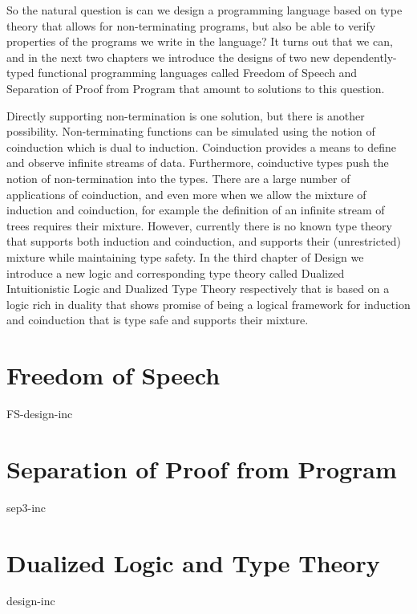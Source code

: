 \documentclass[phd,appendix,dedicationpage,ackpage,epigraphpage]{uithesis}
\begin{document}
So the natural question is can we design a programming language based
on type theory that allows for non-terminating programs, but also be
able to verify properties of the programs we write in the language?
It turns out that we can, and in the next two chapters we introduce
the designs of two new dependently-typed functional programming
languages called Freedom of Speech and Separation of Proof from
Program that amount to solutions to this question.

Directly supporting non-termination is one solution, but there is
another possibility.  Non-terminating functions can be simulated using
the notion of coinduction which is dual to induction.  Coinduction
provides a means to define and observe infinite streams of data.
Furthermore, coinductive types push the notion of non-termination into
the types. There are a large number of applications of coinduction,
and even more when we allow the mixture of induction and coinduction,
for example the definition of an infinite stream of trees requires
their mixture.  However, currently there is no known type theory that
supports both induction and coinduction, and supports their
(unrestricted) mixture while maintaining type safety.  In the third
chapter of Design we introduce a new logic and corresponding type
theory called Dualized Intuitionistic Logic and Dualized Type Theory
respectively that is based on a logic rich in duality that shows
promise of being a logical framework for induction and coinduction
that is type safe and supports their mixture.

\chapter{Freedom of Speech}
\label{chap:freedom_of_speech}
{FS-design-inc}

\chapter{Separation of Proof from Program}
\label{chap:separation_of_proof_from_program}
{sep3-inc}

\chapter{Dualized Logic and Type Theory}
\label{chap:dualized_type_theory_de}
{design-inc}
\end{document}
